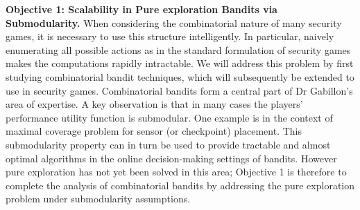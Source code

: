 \textbf{Objective 1: Scalability in Pure exploration Bandits via Submodularity.}
When considering the combinatorial nature of many security games, it is necessary to use this structure intelligently.  In particular, naively enumerating all possible actions as in the standard formulation of security games makes the computations rapidly intractable.  
We will address this problem by first studying combinatorial bandit techniques, which will subsequently be extended to use in security games.  Combinatorial bandits form a central part of Dr Gabillon's area of expertise.   A key observation is that in many cases the players' performance utility function is submodular. One example is in the context of maximal coverage problem for sensor (or checkpoint) placement\cite{krause2011randomized}. 
 This submodularity property can in turn be used to provide tractable and almost optimal algorithms in the online decision-making settings of bandits\cite{gabillon2013adaptive}.  However pure exploration has not yet been solved in this area; Objective 1 is therefore to complete the analysis of combinatorial bandits by addressing the pure exploration problem under submodularity assumptions.
% 
 
 

